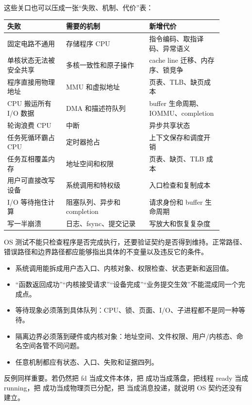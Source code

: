 这些关口也可以压成一张“失败、机制、代价”表：

\begin{longtable}{|p{0.24\linewidth}|p{0.34\linewidth}|p{0.3\linewidth}|}
\toprule
失败 & 需要的机制 & 新增代价 \\
\midrule
固定电路不通用 & 存储程序 CPU & 指令编码、取指译码、异常语义 \\\tablerowrule
单核状态无法被安全共享 & 多核一致性和原子操作 & cache line 迁移、内存序、锁竞争 \\\tablerowrule
程序直接用物理地址 & MMU 和虚拟地址 & 页表、TLB、缺页成本 \\\tablerowrule
CPU 搬运所有 I/O 数据 & DMA 和描述符队列 & buffer 生命周期、IOMMU、completion \\\tablerowrule
轮询浪费 CPU & 中断 & 异步共享状态 \\\tablerowrule
任务死循环霸占 CPU & 定时器抢占 & 上下文保存和调度开销 \\\tablerowrule
任务互相覆盖内存 & 地址空间和权限 & 页表、缺页、TLB 成本 \\\tablerowrule
用户可直接改写设备 & 系统调用和特权级 & 入口检查和复制成本 \\\tablerowrule
I/O 等待拖住计算 & 阻塞队列、异步和 completion & 请求身份和 buffer 生命周期 \\\tablerowrule
写一半崩溃 & 日志、fsync、提交记录 & 写放大和恢复复杂度 \\
\bottomrule
\end{longtable}

OS 测试不能只检查程序是否完成执行，还要验证契约是否得到维持。正常路径、错误路径和边界路径都应能够指出具体的不变量以及违反它的条件。

\begin{rubricbox}
\begin{itemize}
\tightlist
\item 系统调用能拆成用户态入口、内核对象、权限检查、状态更新和返回值。
\item “函数返回成功”“内核接受请求”“设备完成”“业务提交生效”不能混成同一个完成点。
\item 等待现象必须落到具体队列：CPU、锁、页面、I/O、子进程都不是同一种等待。
\item 隔离边界必须落到硬件或内核对象：地址空间、文件权限、用户/内核态、命名空间各管不同问题。
\item 任意机制都应有状态、入口、失败和证据四列。
\end{itemize}
\end{rubricbox}

反例同样重要。若仍然把 fd 当成文件本体，把  成功当成落盘，把线程 ready 当成 running，把  成功当成物理页已分配，把  当成消息投递，就说明 OS 契约还没有建立。

